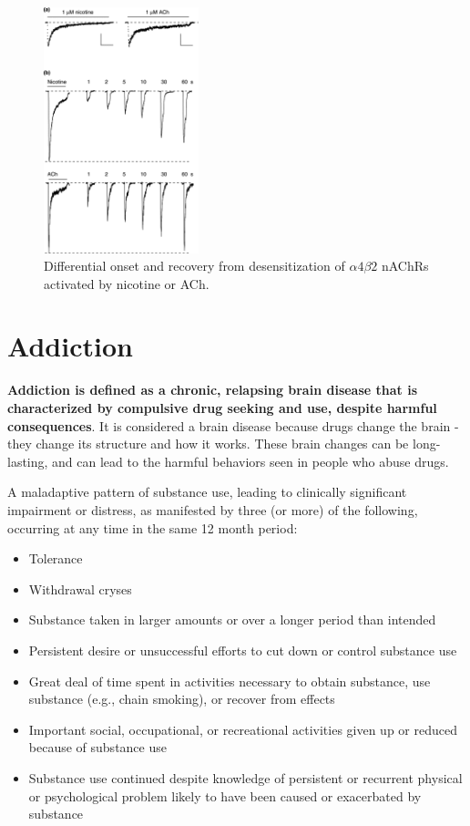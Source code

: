 \documentclass{book}
\begin{document}
\begin{figure}
    \centering
    \includegraphics[width=0.4\textwidth]{images3/image6.png}
    \caption{\label{fig:nic}Differential onset and recovery from desensitization of $\alpha 4 \beta 2$ nAChRs activated by nicotine or ACh.}
\end{figure}


\section{Addiction}
\textbf{Addiction is defined as a chronic, relapsing brain disease that is characterized by compulsive drug seeking and use, despite harmful consequences}.
It is considered a brain disease because drugs change the brain - they change its structure and how it works. 
These brain changes can be long-lasting, and can lead to the harmful behaviors seen in people who abuse drugs.

A maladaptive pattern of substance use, leading to clinically significant impairment or distress, as manifested by three (or more) of the following, occurring at any time in the same 12 month period:

\begin{itemize}
    \item Tolerance
    \item Withdrawal cryses
    \item Substance taken in larger amounts or over a longer period than intended
    \item Persistent desire or unsuccessful efforts to cut down or control substance use
    \item Great deal of time spent in activities necessary to obtain substance, use substance (e.g., chain smoking), or recover from effects
    \item Important social, occupational, or recreational activities given up or reduced because of substance use
    \item Substance use continued despite knowledge of persistent or recurrent physical or psychological problem likely to have been caused or exacerbated by substance
\end{itemize}
\end{document}
